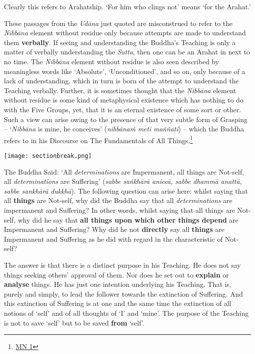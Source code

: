 Clearly this refers to Arahatship. `For him who clings not' means `for the Arahat.'

These passages from the \emph{Udāna} just quoted are misconstrued to refer to the \emph{Nibbāna} element without residue only because attempts are made to understand them \textbf{verbally}. If seeing and understanding the Buddha's Teaching is only a matter of verbally understanding the \emph{Sutta}, then one can be an Arahat in next to no time. The \emph{Nibbāna} element without residue is also seen described by meaningless words like `Absolute', `Unconditioned', and so on, only because of a lack of understanding, which in turn is born of the attempt to understand the Teaching verbally. Further, it is sometimes thought that the \emph{Nibbāna} element without residue is some kind of metaphysical existence which has nothing to do with the Five Groups, yet, that it is an eternal existence of some sort or other. Such a view can arise owing to the presence of that very subtle form of Grasping -- `\emph{Nibbāna} is mine, he conceives' (\emph{nibbānaṁ meti maññati}) -- which the Buddha refers to in his Discourse on The Fundamentals of All Things.\footnote{\href{https://suttacentral.net/mn1/en/bodhi}{MN 1}}

\texttt{[image: sectionbreak.png]}

The Buddha Said: `All \emph{determinations} are Impermanent, all things are Not-self, all \emph{determinations} are Suffering' (\emph{sabbe saṅkhārā aniccā, sabbe dhammā anattā, sabbe sankhārā dukkhā}). The following question can arise here: whilst saying that all \textbf{things} are Not-self, why did the Buddha say that all \emph{determinations} are impermanent and Suffering? In other words, whilst saying that all things are Not-self, why did he say that \textbf{all things upon which other things depend} are Impermanent and Suffering? Why did he not \textbf{directly} say all \textbf{things} are Impermanent and Suffering as he did with regard in the characteristic of Not-self?

The answer is that there is a distinct purpose in his Teaching. He does not say things seeking others' approval of them. Nor does he set out to \textbf{explain} or \textbf{analyse} things. He has just one intention underlying his Teaching. That is, purely and simply, to lead the follower towards the extinction of Suffering. And this extinction of Suffering is at one and the same time the extinction of all notions of `self' and of all thoughts of `I' and `mine'. The purpose of the Teaching is not to save `self' but to be saved \textbf{from} `self'.

